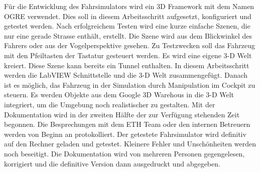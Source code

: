 Für die Entwicklung des Fahrsimulators wird ein 3D Framework mit dem Namen OGRE verwendet. Dies soll in diesem Arbeitsschritt aufgesetzt, konfiguriert und getestet werden. Nach erfolgreichem Testen wird eine kurze einfache Szenen, die nur eine gerade Strasse enthält, erstellt. Die Szene wird aus dem Blickwinkel des Fahrers oder aus der Vogelperspektive gesehen. Zu Testzwecken soll das Fahrzeug mit den Pfeiltasten der Tastatur gesteuert werden.
Es wird eine eigene 3-D Welt kreiert. Diese Szene kann bereits ein Tunnel enthalten. 
In diesem Arbeitsschritt werden die LabVIEW Schnittstelle und die 3-D Welt zusammengefügt. Danach ist es möglich, das Fahrzeug in der Simulation durch Manipulation im Cockpit zu steuern. 
Es werden Objekte aus dem Google 3D Warehous in die 3-D Welt integriert, um die Umgebung noch realistischer zu gestalten. 
Mit der Dokumentation wird in der zweiten Hälfte der zur Verfügung stehenden Zeit begonnen. Die Besprechungen mit dem ETH Team oder den internen Betreuern werden von Beginn an protokolliert.
Der getestete Fahrsimulator wird definitiv auf den Rechner geladen und getestet. Kleinere Fehler und Unschönheiten werden noch beseitigt. 
Die Dokumentation wird von mehreren Personen gegengelesen, korrigiert und die definitive Version dann ausgedruckt und abgegeben. 